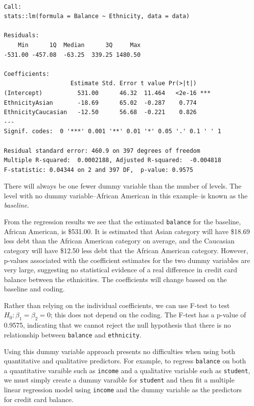\documentclass[
  letterpaper,
  DIV=11,
  numbers=noendperiod]{scrreprt}
\begin{document}
\begin{verbatim}

Call:
stats::lm(formula = Balance ~ Ethnicity, data = data)

Residuals:
    Min      1Q  Median      3Q     Max 
-531.00 -457.08  -63.25  339.25 1480.50 

Coefficients:
                   Estimate Std. Error t value Pr(>|t|)    
(Intercept)          531.00      46.32  11.464   <2e-16 ***
EthnicityAsian       -18.69      65.02  -0.287    0.774    
EthnicityCaucasian   -12.50      56.68  -0.221    0.826    
---
Signif. codes:  0 '***' 0.001 '**' 0.01 '*' 0.05 '.' 0.1 ' ' 1

Residual standard error: 460.9 on 397 degrees of freedom
Multiple R-squared:  0.0002188, Adjusted R-squared:  -0.004818 
F-statistic: 0.04344 on 2 and 397 DF,  p-value: 0.9575
\end{verbatim}

There will always be one fewer dummy variable than the number of levels.
The level with no dummy variable--African American in this example--is
known as the \emph{baseline}.

From the regression results we see that the estimated \texttt{balance}
for the baseline, African American, is \$531.00. It is estimated that
Asian category will have \$18.69 less debt than the African American
category on average, and the Caucasian category will have \$12.50 less
debt that the African American category. However, p-values associated
with the coefficient estimates for the two dummy variables are very
large, suggesting no statistical evidence of a real difference in credit
card balance between the ethnicities. The coefficients will change
bassed on the baseline and coding.

Rather than relying on the individual coefficients, we can use F-test to
test \(H_0 : \beta_1 = \beta_2 = 0\); this does not depend on the
coding. The F-test has a p-value of 0.9575, indicating that we cannot
reject the null hypothesis that there is no relationship between
\texttt{balance} and \texttt{ethnicity}.

Using this dummy variable approach presents no difficulties when using
both quantitative and qualitative predictors. For example, to regress
\texttt{balance} on both a quantitative varaible such as \texttt{income}
and a qualitative variable such as \texttt{student}, we must simply
create a dummy varaible for \texttt{student} and then fit a multiple
linear regression model using \texttt{income} and the dummy variable as
the predictors for credit card balance.
\end{document}
